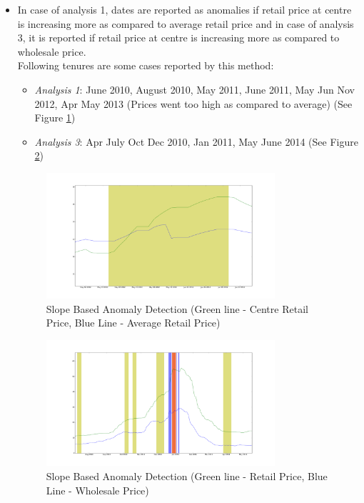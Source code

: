 \documentclass[a4paper,10pt]{report}
\begin{document}
			
		\begin{itemize}
		
			\item In case of analysis 1, dates are reported as anomalies if retail price at centre is increasing more as compared to average retail price and in case of analysis 3, it is reported if retail price at centre is increasing more as compared to wholesale price. \\
			Following tenures are some cases reported by this method:
			\begin{itemize}
				\item \textit{Analysis 1}: June 2010, August 2010, May 2011, June 2011, May Jun Nov 2012, Apr May 2013 (Prices went too high as compared to average) (See Figure \ref{fig:12111})
				\item \textit{Analysis 3}: Apr July Oct Dec 2010, Jan 2011, May June 2014 (See Figure \ref{fig:12131})
			\end{itemize}
			\begin{figure}[H]
		    	\centering
  		    	\includegraphics[width=0.8\textwidth]{graphs/12111.png}
		    	\caption{Slope Based Anomaly Detection (Green line - Centre Retail Price, Blue Line - Average Retail Price)}
		    	\label{fig:12111}
			\end{figure}
			
			\begin{figure}[H]
		    	\centering
  		    	\includegraphics[width=0.8\textwidth]{graphs/12131.png}
		    	\caption{Slope Based Anomaly Detection (Green line - Retail Price, Blue Line - Wholesale Price)}
		    	\label{fig:12131}
			\end{figure}
			

\end{itemize}
\end{document}

